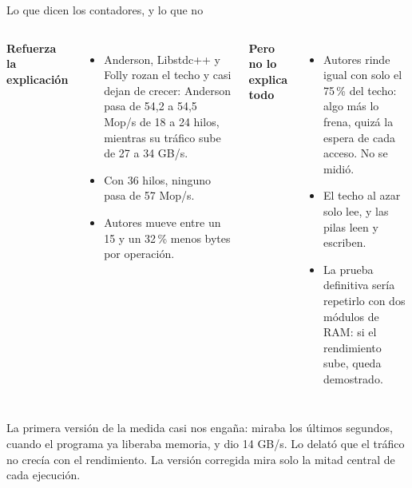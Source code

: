 \begin{frame}{Lo que dicen los contadores, y lo que no}
  \begin{columns}[T,onlytextwidth]
    \small\textbf{\color{bien}Refuerza la explicación}\par\vspace{1mm}
    \footnotesize
    \begin{itemize}
      \item Anderson, Libstdc++ y Folly rozan el techo y casi dejan de crecer: Anderson pasa de 54,2 a 54,5 Mop/s de 18 a 24 hilos, mientras su tráfico sube de 27 a 34 GB/s.
      \item Con 36 hilos, ninguno pasa de 57 Mop/s.
      \item Autores mueve entre un 15 y un 32\,\% menos bytes por operación.
    \end{itemize}
    \small\textbf{\color{mal}Pero no lo explica todo}\par\vspace{1mm}
    \footnotesize
    \begin{itemize}
      \item Autores rinde igual con solo el 75\,\% del techo: algo más lo frena, quizá la espera de cada acceso. No se midió.
      \item El techo al azar solo lee, y las pilas leen y escriben.
      \item La prueba definitiva sería repetirlo con dos módulos de RAM: si el rendimiento sube, queda demostrado.
    \end{itemize}
  \end{columns}
  \vspace{3mm}
  \begin{ojo}La primera versión de la medida casi nos engaña: miraba los últimos segundos, cuando el programa ya liberaba memoria, y dio 14 GB/s. Lo delató que el tráfico no crecía con el rendimiento. La versión corregida mira solo la mitad central de cada ejecución.\end{ojo}
\end{frame}

